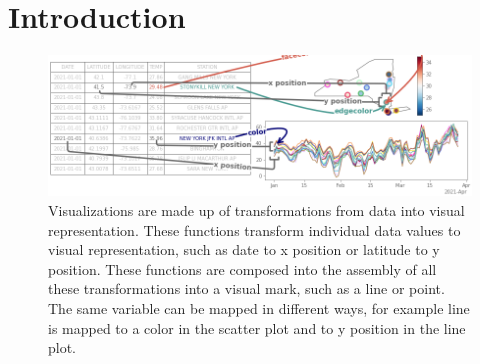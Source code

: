 \documentclass[../main.tex]{subfiles}
\begin{document}
\section{Introduction}
\label{sec:intro}
\begin{figure}[h]
    \includegraphics[width=1\textwidth]{figures/intro/functions.png}
    \caption{Visualizations are made up of transformations from data into visual representation. These functions transform individual data values to visual representation, such as date to x position or latitude to y position. These functions are composed into the assembly of all these transformations into a visual mark, such as a line or point. %
    The same variable can be mapped in different ways, for example line is mapped to a color in the scatter plot and to y position in the line plot.}
    \label{fig:intro:artist}
\end{figure}
\end{document}
